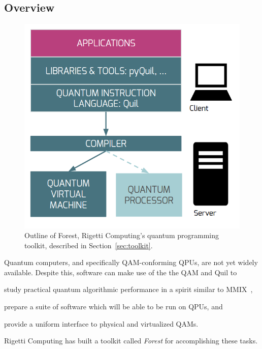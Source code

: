 \documentclass[conference]{IEEEtran}
\begin{document}
\subsection{Overview}
\begin{figure}
    \centering
    \includegraphics[scale=0.35]{quil_outline.png}
    \caption{Outline of Forest, Rigetti Computing's quantum programming toolkit, described in Section~\ref{sec:toolkit}.}
    \label{fig:toolkit}
\end{figure}
Quantum computers, and specifically QAM-conforming QPUs, are not yet widely available. Despite this, software can make use of the the QAM and Quil to
\begin{enumerate*}[label={(\alph*)}]
\item study practical quantum algorithmic performance in a spirit similar to MMIX~\cite{KnutMMIX2005},
\item prepare a suite of software which will be able to be run on QPUs, and
\item provide a uniform interface to physical and virtualized QAMs.
\end{enumerate*}
Rigetti Computing has built a toolkit called \emph{Forest} for accomplishing these tasks.
\end{document}
